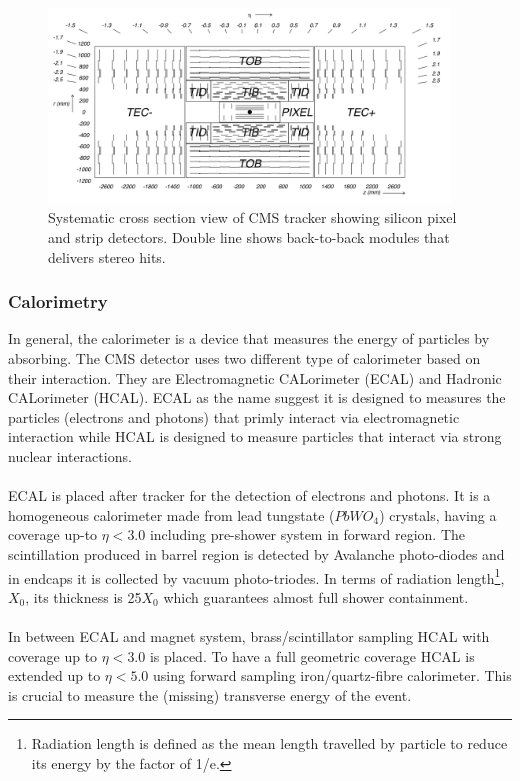 \begin{figure}[!htbp]
	\centering
	\includegraphics[width=0.95\textwidth]{figures/LHC/tracker-cross-section.png}
	\caption{Systematic cross section view of CMS tracker showing silicon pixel and strip detectors. Double line shows back-to-back modules that delivers stereo hits.}
	\label{fig:tracker-cross-section}
\end{figure}


\subsubsection{Calorimetry} %
\label{ssub:calorimetry}
In general, the calorimeter is a device that measures the energy of particles by absorbing. The CMS detector uses two different type of calorimeter based on their interaction. They are Electromagnetic CALorimeter (ECAL) and Hadronic CALorimeter (HCAL). ECAL as the name suggest it is designed to measures the particles (electrons and photons) that primly interact via electromagnetic interaction while HCAL is designed to measure particles that interact via strong nuclear interactions.\\\\
ECAL is placed after tracker for the detection of  electrons and photons. It is a homogeneous calorimeter made from lead tungstate ($PbWO_4$) crystals, having a coverage up-to $\eta < 3.0$ including pre-shower system in forward region. The scintillation produced in barrel region is detected by Avalanche photo-diodes and in endcaps it is collected by vacuum photo-triodes. In terms of radiation length\footnote{Radiation length is defined as the mean length travelled by particle to reduce its energy by the factor of 1/e.}, $X_0$, its thickness is 25$X_0$ which guarantees almost full shower containment.\\\\
In between ECAL and magnet system, brass/scintillator sampling HCAL with coverage up to $\eta < 3.0$ is placed. To have a full geometric coverage HCAL is extended up to $\eta < 5.0$ using forward sampling iron/quartz-fibre calorimeter. This is crucial to measure the (missing) transverse energy of the event.

